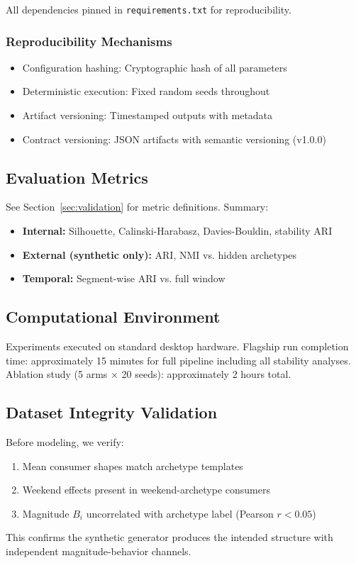 All dependencies pinned in \texttt{requirements.txt} for reproducibility.

\subsubsection{Reproducibility Mechanisms}

\begin{itemize}
    \item Configuration hashing: Cryptographic hash of all parameters
    \item Deterministic execution: Fixed random seeds throughout
    \item Artifact versioning: Timestamped outputs with metadata
    \item Contract versioning: JSON artifacts with semantic versioning (v1.0.0)
\end{itemize}

\subsection{Evaluation Metrics}

See Section~\ref{sec:validation} for metric definitions. Summary:
\begin{itemize}
    \item \textbf{Internal:} Silhouette, Calinski-Harabasz, Davies-Bouldin, stability ARI
    \item \textbf{External (synthetic only):} ARI, NMI vs. hidden archetypes
    \item \textbf{Temporal:} Segment-wise ARI vs. full window
\end{itemize}

\subsection{Computational Environment}

Experiments executed on standard desktop hardware. Flagship run completion time: approximately 15 minutes for full pipeline including all stability analyses. Ablation study (5 arms × 20 seeds): approximately 2 hours total.

\subsection{Dataset Integrity Validation}

Before modeling, we verify:
\begin{enumerate}
    \item Mean consumer shapes match archetype templates
    \item Weekend effects present in weekend-archetype consumers
    \item Magnitude $B_i$ uncorrelated with archetype label (Pearson $r < 0.05$)
\end{enumerate}

This confirms the synthetic generator produces the intended structure with independent magnitude-behavior channels.

